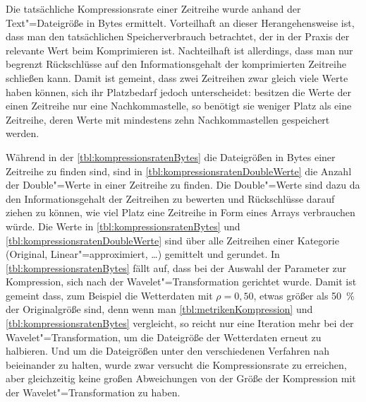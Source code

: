 Die tatsächliche Kompressionsrate einer Zeitreihe wurde anhand der Text"=Dateigröße in Bytes ermittelt. Vorteilhaft an dieser Herangehensweise ist, dass man den tatsächlichen Speicherverbrauch betrachtet, der in der Praxis der relevante Wert beim Komprimieren ist. Nachteilhaft ist allerdings, dass man nur begrenzt Rückschlüsse auf den Informationsgehalt der komprimierten Zeitreihe schließen kann. Damit ist gemeint, dass zwei Zeitreihen zwar gleich viele Werte haben können, sich ihr Platzbedarf jedoch unterscheidet: besitzen die Werte der einen Zeitreihe nur eine Nachkommastelle, so benötigt sie weniger Platz als eine Zeitreihe, deren Werte mit mindestens zehn Nachkommastellen gespeichert werden. 

Während in der \autoref{tbl:kompressionsratenBytes} die Dateigrößen in Bytes einer Zeitreihe zu finden sind, sind in \autoref{tbl:kompressionsratenDoubleWerte} die Anzahl der Double"=Werte in einer Zeitreihe zu finden. Die Double"=Werte sind dazu da den Informationsgehalt der Zeitreihen zu bewerten und Rückschlüsse darauf ziehen zu können, wie viel Platz eine Zeitreihe in Form eines Arrays verbrauchen würde. Die Werte in \autoref{tbl:kompressionsratenBytes} und \autoref{tbl:kompressionsratenDoubleWerte} sind über alle Zeitreihen einer Kategorie (Original, Linear"=approximiert, \dots) gemittelt und gerundet. In \autoref{tbl:kompressionsratenBytes} fällt auf, dass bei der Auswahl der Parameter zur Kompression, sich nach der Wavelet"=Transformation gerichtet wurde. Damit ist gemeint dass, zum Beispiel die Wetterdaten mit $\rho=0,50$, etwas größer als 50~\% der Originalgröße sind, denn wenn man \autoref{tbl:metrikenKompression} und \autoref{tbl:kompressionsratenBytes} vergleicht, so reicht nur eine Iteration mehr bei der Wavelet"=Transformation, um die Dateigröße der Wetterdaten erneut zu halbieren. Und um die Dateigrößen unter den verschiedenen Verfahren nah beieinander zu halten, wurde zwar versucht die Kompressionsrate zu erreichen, aber gleichzeitig keine großen Abweichungen von der Größe der Kompression mit der Wavelet"=Transformation zu haben. 


